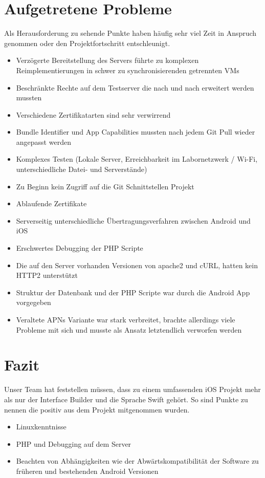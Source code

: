 \section{Aufgetretene Probleme}
Als Herausforderung zu sehende Punkte haben häufig sehr viel Zeit in Anspruch genommen oder den Projektfortschritt entschleunigt.


\begin{itemize}
\item Verzögerte Bereitstellung des Servers führte zu komplexen Reimplementierungen in schwer zu synchronisierenden getrennten VMs
\item Beschränkte Rechte auf dem Testserver die nach und nach erweitert werden mussten
\item Verschiedene Zertifikatarten sind sehr verwirrend
\item Bundle Identifier und App Capabilities mussten nach jedem Git Pull wieder angepasst werden
\item Komplexes Testen (Lokale Server, Erreichbarkeit im Labornetzwerk / Wi-Fi, unterschiedliche Datei- und Serverstände) 
\item Zu Beginn kein Zugriff auf die Git Schnittstellen Projekt
\item Ablaufende Zertifikate
\item Serverseitig unterschiedliche Übertragungsverfahren zwischen Android und iOS
\item Erschwertes Debugging der PHP Scripte
\item Die auf den Server vorhanden Versionen von apache2 und cURL, hatten kein HTTP2 unterstützt  
\item Struktur der Datenbank und der PHP Scripte war durch die Android App vorgegeben
\item Veraltete APNs Variante war stark verbreitet, brachte allerdings viele Probleme mit sich und musste als Ansatz letztendlich verworfen werden
\end{itemize}


\section{Fazit}
Unser Team hat feststellen müssen, dass zu einem umfassenden iOS Projekt mehr als nur der Interface Builder und die Sprache Swift gehört. So sind Punkte zu nennen die positiv aus dem Projekt mitgenommen wurden.
\begin{itemize}
\item Linuxkenntnisse
\item PHP und Debugging auf dem Server
\item Beachten von Abhängigkeiten wie der Abwärtskompatibilität der Software zu früheren und bestehenden Android Versionen
\end{itemize}

